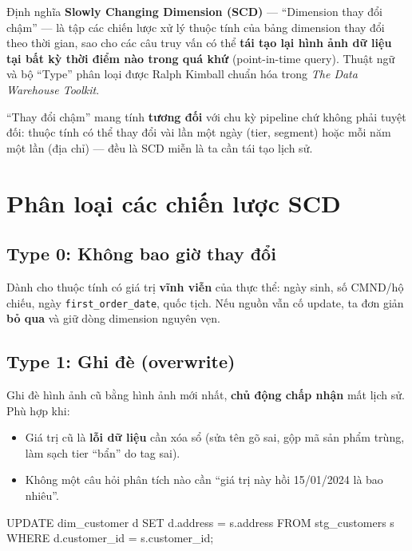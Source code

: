 \documentclass[12pt]{article}
\begin{document}
\begin{infobox}{Định nghĩa}
\textbf{Slowly Changing Dimension (SCD)} --- ``Dimension thay đổi chậm'' --- là tập các chiến lược xử lý thuộc tính của bảng dimension thay đổi theo thời gian, sao cho các câu truy vấn có thể \textbf{tái tạo lại hình ảnh dữ liệu tại bất kỳ thời điểm nào trong quá khứ} (point-in-time query). Thuật ngữ và bộ ``Type'' phân loại được Ralph Kimball chuẩn hóa trong \textit{The Data Warehouse Toolkit}.
\end{infobox}

``Thay đổi chậm'' mang tính \textbf{tương đối} với chu kỳ pipeline chứ không phải tuyệt đối: thuộc tính có thể thay đổi vài lần một ngày (tier, segment) hoặc mỗi năm một lần (địa chỉ) --- đều là SCD miễn là ta cần tái tạo lịch sử.

\section{Phân loại các chiến lược SCD}

\subsection{Type 0: Không bao giờ thay đổi}

Dành cho thuộc tính có giá trị \textbf{vĩnh viễn} của thực thể: ngày sinh, số CMND/hộ chiếu, ngày \texttt{first\_order\_date}, quốc tịch. Nếu nguồn vẫn cố update, ta đơn giản \textbf{bỏ qua} và giữ dòng dimension nguyên vẹn.

\subsection{Type 1: Ghi đè (overwrite)}

Ghi đè hình ảnh cũ bằng hình ảnh mới nhất, \textbf{chủ động chấp nhận} mất lịch sử. Phù hợp khi:
\begin{itemize}
    \item Giá trị cũ là \textbf{lỗi dữ liệu} cần xóa sổ (sửa tên gõ sai, gộp mã sản phẩm trùng, làm sạch tier ``bẩn'' do tag sai).
    \item Không một câu hỏi phân tích nào cần ``giá trị này hồi 15/01/2024 là bao nhiêu''.
\end{itemize}

\begin{aivnsqlbox}
UPDATE dim_customer d
SET    d.address = s.address
FROM   stg_customers s
WHERE  d.customer_id = s.customer_id;
\end{aivnsqlbox}
\end{document}
